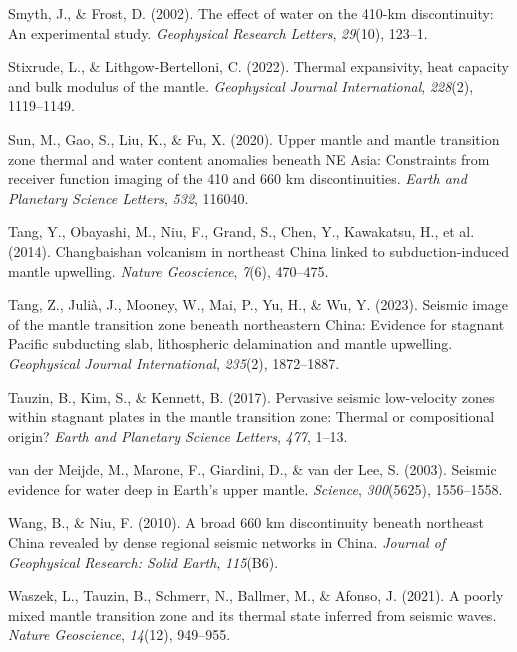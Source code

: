 \documentclass[draft,linenumbers]{agujournal2019}
\newlength{\cslhangindent}
\newenvironment{CSLReferences}[2]
 {\begin{list}{}{
  \setlength{\itemindent}{0pt}
  \setlength{\leftmargin}{0pt}
  \setlength{\parsep}{0pt}
  \ifodd #1
   \setlength{\leftmargin}{\cslhangindent}
   \setlength{\itemindent}{-\cslhangindent}
  \fi
  \setlength{\itemsep}{#2\baselineskip}
  }
  \item\relax}
 {\end{list}}
\begin{document}
\begin{CSLReferences}{1}{0}
Smyth, J., \& Frost, D. (2002). The effect of water on the 410-km
discontinuity: An experimental study. \emph{Geophysical Research
Letters}, \emph{29}(10), 123--1.

Stixrude, L., \& Lithgow-Bertelloni, C. (2022). Thermal expansivity,
heat capacity and bulk modulus of the mantle. \emph{Geophysical Journal
International}, \emph{228}(2), 1119--1149.

Sun, M., Gao, S., Liu, K., \& Fu, X. (2020). Upper mantle and mantle
transition zone thermal and water content anomalies beneath {NE Asia}:
Constraints from receiver function imaging of the 410 and 660 km
discontinuities. \emph{Earth and Planetary Science Letters}, \emph{532},
116040.

Tang, Y., Obayashi, M., Niu, F., Grand, S., Chen, Y., Kawakatsu, H., et
al. (2014). {Changbaishan} volcanism in northeast {China} linked to
subduction-induced mantle upwelling. \emph{Nature Geoscience},
\emph{7}(6), 470--475.

Tang, Z., Julià, J., Mooney, W., Mai, P., Yu, H., \& Wu, Y. (2023).
Seismic image of the mantle transition zone beneath northeastern
{China}: Evidence for stagnant {Pacific} subducting slab, lithospheric
delamination and mantle upwelling. \emph{Geophysical Journal
International}, \emph{235}(2), 1872--1887.

Tauzin, B., Kim, S., \& Kennett, B. (2017). Pervasive seismic
low-velocity zones within stagnant plates in the mantle transition zone:
Thermal or compositional origin? \emph{Earth and Planetary Science
Letters}, \emph{477}, 1--13.

{van der Meijde, M., Marone, F., Giardini, D., \& van der Lee, S.}
(2003). Seismic evidence for water deep in {Earth}'s upper mantle.
\emph{Science}, \emph{300}(5625), 1556--1558.

Wang, B., \& Niu, F. (2010). A broad 660 km discontinuity beneath
northeast {China} revealed by dense regional seismic networks in
{China}. \emph{Journal of Geophysical Research: Solid Earth},
\emph{115}(B6).

Waszek, L., Tauzin, B., Schmerr, N., Ballmer, M., \& Afonso, J. (2021).
A poorly mixed mantle transition zone and its thermal state inferred
from seismic waves. \emph{Nature Geoscience}, \emph{14}(12), 949--955.


\end{CSLReferences}
\end{document}

